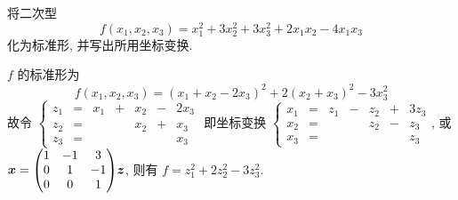 \begin{example}
    将二次型 $$f(x_1,x_2,x_3)=x_1^2+3x_2^2+3x_3^2+2x_1x_2-4x_1x_3$$ 化为标准形, 并写出所用坐标变换.
\end{example}
\begin{solution}
    $f$ 的标准形为 $$f(x_1,x_2,x_3)=(x_1+x_2-2x_3)^2+2(x_2+x_3)^2-3x_3^2$$
    故令 $\left\{\begin{matrix}
            z_1 & = & x_1 & + & x_2 & - & 2x_3 \\
            z_2 & = &     &   & x_2 & + & x_3  \\
            z_3 & = &     &   &     &   & x_3
        \end{matrix}\right.$ 即坐标变换 $\left\{\begin{matrix}
            x_1 & = & z_1 & - & z_2 & + & 3z_3 \\
            x_2 & = &     &   & z_2 & - & z_3  \\
            x_3 & = &     &   &     &   & z_3
        \end{matrix}\right.$, 或 $\vb*{x}=\mqty(1&-1&3\\0&1&-1\\0&0&1)\vb*{z}$, 则有 $f=z_1^2+2z_2^2-3z_3^2.$
\end{solution}

